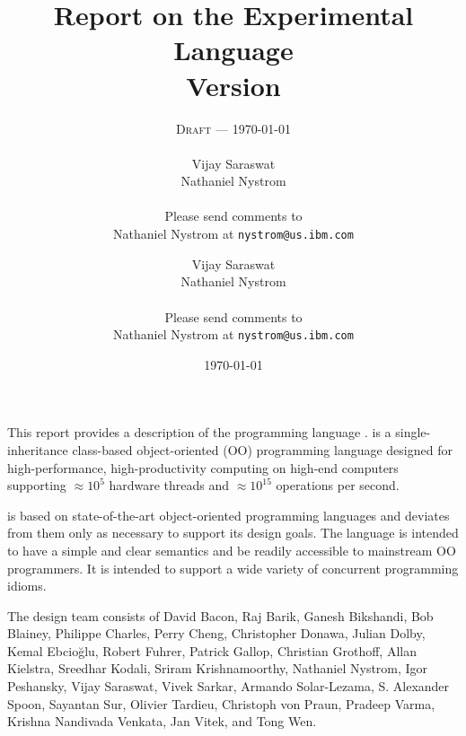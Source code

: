 
\thispagestyle{empty}


\title{Report on the Experimental Language \Xten \\
\large Version \integerversion}
\ifdraft
\author{\textsc{Draft} --- \today \\
\\
Vijay Saraswat \\
Nathaniel Nystrom \\
\\
Please send comments to \\
Nathaniel Nystrom at \texttt{nystrom@us.ibm.com}}
\else
\author{
Vijay Saraswat \\
Nathaniel Nystrom \\
\\
Please send comments to \\
Nathaniel Nystrom at \texttt{nystrom@us.ibm.com}}
\fi
\date{\today}

\maketitle

\newcommand\authorsc[1]{#1}

This report provides a description of the programming
language \Xten. \Xten{} is a single-inheritance class-based object-oriented
(OO) programming language designed for high-performance, high-productivity
computing on high-end computers supporting $\approx 10^5$ hardware threads
and $\approx 10^{15}$ operations per second. 

{}\Xten{} is based on state-of-the-art object-oriented programming
languages and deviates from them only as necessary to support its
design goals. The language is intended to have a simple and clear
semantics and be readily accessible to mainstream OO programmers. It
is intended to support a wide variety of concurrent programming
idioms.


The \Xten{} design team consists of
\authorsc{David Bacon}, 
\authorsc{Raj Barik}, 
\authorsc{Ganesh Bikshandi}, 
\authorsc{Bob Blainey}, 
\authorsc{Philippe Charles}, 
\authorsc{Perry Cheng}, 
\authorsc{Christopher Donawa}, 
\authorsc{Julian Dolby}, 
\authorsc{Kemal Ebcio\u{g}lu},
\authorsc{Robert Fuhrer},
\authorsc{Patrick Gallop}, 
\authorsc{Christian Grothoff}, 
\authorsc{Allan Kielstra}, 
\authorsc{Sreedhar Kodali}, 
\authorsc{Sriram Krishnamoorthy}, 
\authorsc{Nathaniel Nystrom},
\authorsc{Igor Peshansky}, 
\authorsc{Vijay Saraswat},
\authorsc{Vivek Sarkar},
\authorsc{Armando Solar-Lezama},  
\authorsc{S. Alexander Spoon}, 
\authorsc{Sayantan Sur}, 
\authorsc{Olivier Tardieu},
\authorsc{Christoph von Praun},
\authorsc{Pradeep Varma},
\authorsc{Krishna Nandivada Venkata},
\authorsc{Jan Vitek}, and
\authorsc{Tong Wen}.

